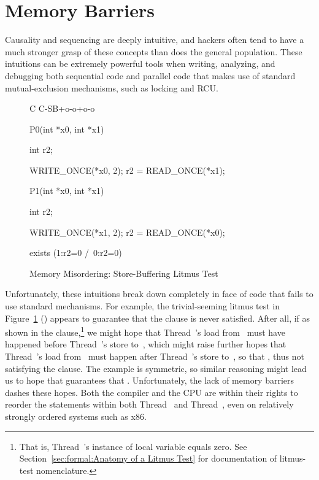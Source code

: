 
\section{Memory Barriers}
\label{sec:advsync:Memory Barriers}

Causality and sequencing are deeply intuitive, and hackers often
tend to have a much stronger grasp of these concepts than does
the general population.
These intuitions can be extremely powerful tools when writing, analyzing,
and debugging both sequential code and parallel code that makes
use of standard mutual-exclusion mechanisms, such as locking and
RCU.

\begin{figure}
{ \scriptsize
\begin{verbbox}[\LstLineNo]
C C-SB+o-o+o-o
{
}

P0(int *x0, int *x1)
{
  int r2;

  WRITE_ONCE(*x0, 2);
  r2 = READ_ONCE(*x1);
}


P1(int *x0, int *x1)
{
  int r2;

  WRITE_ONCE(*x1, 2);
  r2 = READ_ONCE(*x0);
}

exists (1:r2=0 /\ 0:r2=0)
\end{verbbox}
}
\centering
\theverbbox
\caption{Memory Misordering: Store-Buffering Litmus Test}
\label{fig:advsync:Memory Misordering: Store-Buffering Litmus Test}
\end{figure}

Unfortunately, these intuitions break down completely in face of
code that fails to use standard mechanisms.
For example, the trivial-seeming litmus test in
Figure~\ref{fig:advsync:Memory Misordering: Store-Buffering Litmus Test}
()
appears to guarantee that the  clause is never satisfied.
After all, if  as shown in the  clause,\footnote{
	That is, Thread~'s instance of local variable 
	equals zero.
	See Section~\ref{sec:formal:Anatomy of a Litmus Test}
	for documentation of litmus-test nomenclature.}
we might hope that Thread~'s
load from~ must have happened before Thread~'s store to~,
which might raise
further hopes that Thread~'s load from~ must happen after
Thread~'s store to~, so that ,
thus not satisfying the  clause.
The example is symmetric, so similar reasoning might lead
us to hope that  guarantees that .
Unfortunately, the lack of memory barriers dashes these hopes.
Both the compiler and the CPU are within their rights to reorder
the statements within both Thread~ and Thread~,
even on relatively strongly ordered systems such as x86.

